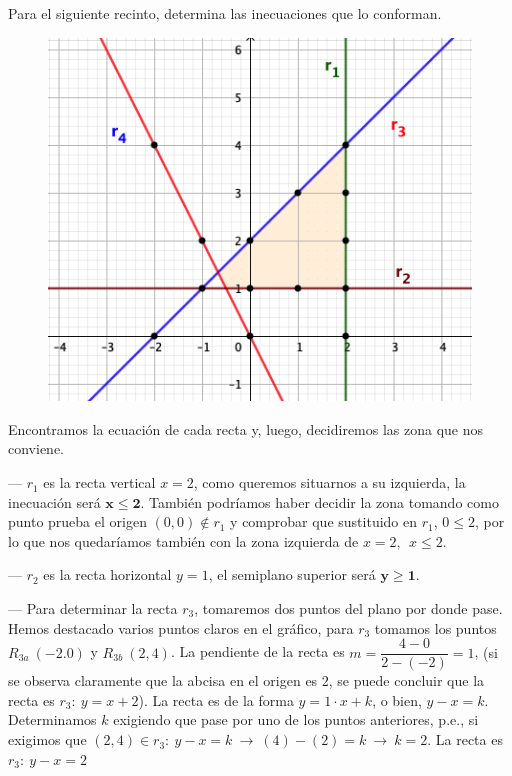\vspace{5mm}
\begin{ejemplo}
\begin{ejre}

Para el siguiente recinto, determina las inecuaciones que lo conforman.
	
\end{ejre}
\end{ejemplo}

\vspace{5mm}
\begin{multicols}{2}
	\begin{figure}[H]
	\centering
	\includegraphics[width=.5\textwidth]{imagenes/img10.png}
\end{figure}
\begin{adjustwidth}{5pt}{2pt}
Encontramos la ecuación de cada recta y, luego, decidiremos las zona que nos conviene.

\vspace{7mm}
--- $r_1$ es la recta vertical $x=2$, como queremos situarnos a su izquierda, la inecuación será $\boldsymbol{x\le 2}$. \textcolor{gris}{También podríamos haber decidir la zona tomando como punto prueba el origen $(0,0) \notin r_1$ y comprobar que sustituido en $r_1$, $0\le 2$, por lo que nos quedaríamos también con la zona izquierda de $x=2,\ \ x\le 2$.}
\end{adjustwidth}
\end{multicols}


--- $r_2$ es la recta horizontal $y=1$, el semiplano superior será $\boldsymbol{y\ge 1}$.

\vspace{2mm} --- Para determinar la recta $r_3$, tomaremos dos puntos del plano por donde pase. Hemos destacado varios puntos claros en el gráfico, para $r_3$ tomamos los puntos $R_{3a}\ (-2.0)$ y  $R_{3b}\ (2,4)$. La pendiente de la recta es $m=	\dfrac{4-0}{2-(-2)}=1$, \textcolor{gris}{(si se observa claramente que la abcisa en el origen es $2$, se puede concluir que la recta es $r_3:\ y=x+2$)}. La recta es de la forma $y=1\cdot x + k$, o bien, $y-x=k$. Determinamos $k$ exigiendo que pase por uno de los puntos anteriores, p.e., si exigimos que $(2,4)\in r_3:\ y-x=k \ \to \ (4)-(2)=k \ \rightarrow \ k=2$. La recta es $r_3:\ y-x=2$

